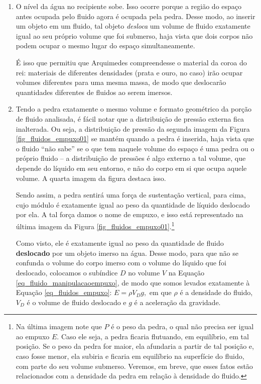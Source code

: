 \begin{enumerate}
    \item [(i)] O nível da água no recipiente sobe. Isso ocorre porque a região do espaço antes ocupada pelo fluido agora é ocupada pela pedra. Desse modo, ao inserir um objeto em um fluido, tal objeto \emph{desloca} um volume de fluido exatamente igual ao seu próprio volume que foi submerso, haja vista que dois corpos não podem ocupar o mesmo lugar do espaço simultaneamente.

    É isso que permitiu que Arquimedes compreendesse o material da coroa do rei: materiais de diferentes densidades (prata e ouro, no caso) irão ocupar volumes diferentes para uma mesma massa, de modo que deslocarão quantidades diferentes de fluidos ao serem imersos.


    \item [(ii)] Tendo a pedra exatamente o mesmo volume e formato geométrico da porção de fluido analisada, é fácil notar que a distribuição de pressão externa fica inalterada. Ou seja, a distribuição de pressão da segunda imagem da Figura \ref{fig_fluidos_empuxo01} se mantém quando a pedra é inserida, haja vista que o fluido ``não sabe'' se o que tem naquele volume do espaço é uma pedra ou o próprio fluido -- a distribuição de pressões é algo externo a tal volume, que depende do líquido em seu entorno, e não do corpo em si que ocupa aquele volume. A quarta imagem da figura destaca isso.

    Sendo assim, a pedra sentirá uma força de sustentação vertical, para cima, cujo módulo é exatamente igual ao peso da quantidade de líquido deslocado por ela. A tal força damos o nome de empuxo, e isso está representado na última imagem da Figura \ref{fig_fluidos_empuxo01}.\footnote{Na última imagem note que $P$ é o peso da pedra, o qual não precisa ser igual ao empuxo $E.$ Caso ele seja, a pedra ficaria flutuando, em equilíbrio, em tal posição. Se o peso da pedra for maior, ela afundaria a partir de tal posição e, caso fosse menor, ela subiria e ficaria em equilíbrio na superfície do fluido, com parte do seu volume submerso. Veremos, em breve, que esses fatos estão relacionados com a densidade da pedra em relação à densidade do fluido.}
    
    
    Como visto, ele é exatamente igual ao peso da quantidade de fluido \textbf{deslocado} por um objeto imerso na água. Desse modo, para que não se confunda o volume do corpo imerso com o volume do líquido que foi deslocado, colocamos o subíndice $D$ no volume $V$ na Equação \eqref{eq_fluido_manipulacaoempuxo}, de modo que somos levados exatamente à Equação \eqref{eq_fluidos_empuxo}: $E= \rho V_D g,$ em que $\rho$ é a densidade do fluido, $V_D$ é o volume de fluido deslocado e $g$ é a aceleração da gravidade.


\end{enumerate}
